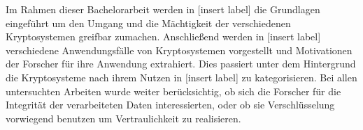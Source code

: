 Im Rahmen dieser Bachelorarbeit werden in [insert label] die Grundlagen eingeführt um den Umgang und die Mächtigkeit der verschiedenen Kryptosystemen greifbar zumachen. Anschließend werden in [insert label] verschiedene Anwendungsfälle von Kryptosystemen vorgestellt und Motivationen der Forscher für ihre Anwendung extrahiert. Dies passiert unter dem Hintergrund die Kryptosysteme nach ihrem Nutzen in [insert label]  zu kategorisieren. Bei allen untersuchten Arbeiten wurde weiter berücksichtig, ob sich die Forscher für die Integrität der verarbeiteten Daten interessierten, oder ob sie Verschlüsselung vorwiegend benutzen um Vertraulichkeit zu realisieren.